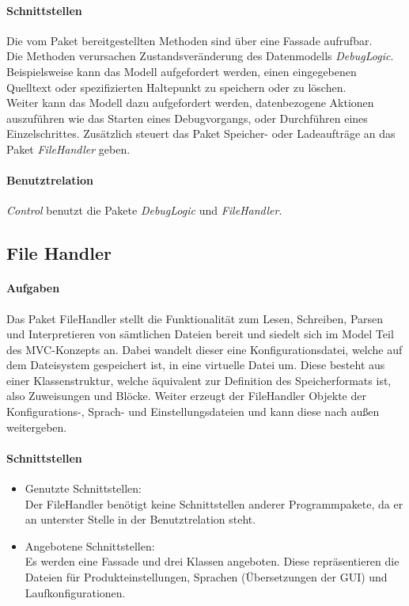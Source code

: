 \documentclass[parskip=full]{scrartcl}
\begin{document}
\paragraph{Schnittstellen}
    Die vom Paket bereitgestellten Methoden sind über eine Fassade aufrufbar.\\
    Die Methoden verursachen Zustandsveränderung des Datenmodells \textit{DebugLogic}.\\
    Beispielsweise kann das Modell aufgefordert werden, einen eingegebenen Quelltext oder spezifizierten Haltepunkt
    zu speichern oder zu löschen.\\
    Weiter kann das Modell dazu aufgefordert werden, datenbezogene Aktionen auszuführen wie
    das Starten eines Debugvorgangs, oder Durchführen eines Einzelschrittes. Zusätzlich steuert das Paket Speicher- oder Ladeaufträge an das Paket \textit{FileHandler} geben. 
\paragraph{Benutztrelation}
    \textit{Control} benutzt die Pakete \textit{DebugLogic} und \textit{FileHandler}.%

\subsection{File Handler}
\paragraph{Aufgaben}
Das Paket FileHandler stellt die Funktionalität zum Lesen, Schreiben, Parsen und Interpretieren von sämtlichen Dateien bereit und siedelt sich im Model Teil des MVC-Konzepts an.
Dabei wandelt dieser eine Konfigurationsdatei, welche auf dem Dateisystem gespeichert ist, in eine virtuelle Datei um.
Diese besteht aus einer Klassenstruktur, welche äquivalent zur Definition des Speicherformats ist, also Zuweisungen und Blöcke.
Weiter erzeugt der FileHandler Objekte der Konfigurations-, Sprach- und Einstellungsdateien und kann diese nach außen weitergeben.
\paragraph{Schnittstellen}
\begin{itemize}
\item Genutzte Schnittstellen: \\
Der FileHandler benötigt keine Schnittstellen anderer Programmpakete, da er an unterster Stelle in der Benutztrelation steht.
\item Angebotene Schnittstellen: \\
Es werden eine Fassade und drei Klassen angeboten.
Diese repräsentieren die Dateien für Produkteinstellungen, Sprachen (Übersetzungen der GUI) und Laufkonfigurationen.

\end{itemize}
\end{document}

